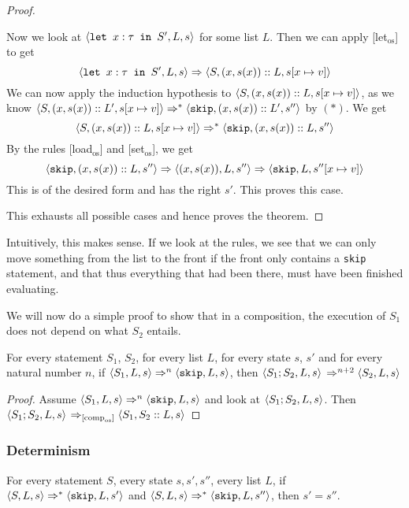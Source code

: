 \begin{proof}
\begin{itemize}[noitemsep]
    Now we look at $\langle \texttt{let }x : \tau \texttt{ in } S', L, s \rangle$ for some list $L$. Then we can apply [let$_{\textrm{os}}$] to get 
    $$\langle \texttt{let }x : \tau \texttt{ in } S', L, s \rangle \Rightarrow \langle S, (x,s(x))::L, s[x\mapsto v] \rangle$$
    We can now apply the induction hypothesis to $\langle S, (x,s(x))::L, s[x\mapsto v] \rangle$, as we know $\langle S, (x,s(x))::L', s[x\mapsto v] \rangle \Rightarrow ^{*} \langle \texttt{skip}, (x,s(x))::L', s'' \rangle$ by $( * )$. We get
    $$\langle S, (x,s(x))::L, s[x\mapsto v] \rangle \Rightarrow ^{*} \langle \texttt{skip}, (x,s(x))::L, s'' \rangle$$
    By the rules [load$_{\textrm{os}}$] and [set$_{\textrm{os}}$], we get 
    $$\langle \texttt{skip}, (x,s(x))::L, s'' \rangle \Rightarrow \langle (x,s(x)), L, s'' \rangle \Rightarrow \langle \texttt{skip}, L, s''[x \mapsto v] \rangle$$
    This is of the desired form and has the right $s'$. This proves this case.
\end{itemize}
This exhausts all possible cases and hence proves the theorem.
\end{proof}

Intuitively, this makes sense. If we look at the rules, we see that we can only move something from the list to the front if the front only contains a \texttt{skip} statement, and that thus everything that had been there, must have been finished evaluating. 

We will now do a simple proof to show that in a composition, the execution of $S_1$ does not depend on what $S_2$ entails. 

\begin{proposition}
For every statement $S_1$, $S_2$, for every list $L$, for every state $s$, $s'$ and for every natural number $n$, if $\langle S_1, L, s \rangle \Rightarrow ^{n} \langle \texttt{skip}, L, s \rangle$, then $\langle S_1;S_2, L, s \rangle$ $\Rightarrow ^{n+2} \langle S_2, L, s \rangle$
\end{proposition}

\begin{proof}
Assume $\langle S_1, L, s \rangle \Rightarrow ^{n} \langle \texttt{skip}, L, s \rangle$ and look at $\langle S_1;S_2, L, s \rangle$. Then \\$\langle S_1;S_2, L, s \rangle$ $\Rightarrow _{[\textrm{comp}_{\textrm{os}}]} \langle S_1, S_2::L, s \rangle$
\end{proof}


\subsubsection*{Determinism}

\begin{theorem}
For every statement $S$, every state $s, s', s''$, every list $L$, if $\langle S, L, s \rangle \Rightarrow ^{*} \langle \texttt{skip}, L, s' \rangle$ and $\langle S, L, s \rangle \Rightarrow ^{*} \langle \texttt{skip}, L, s'' \rangle$, then $s' = s''$.
\end{theorem}

